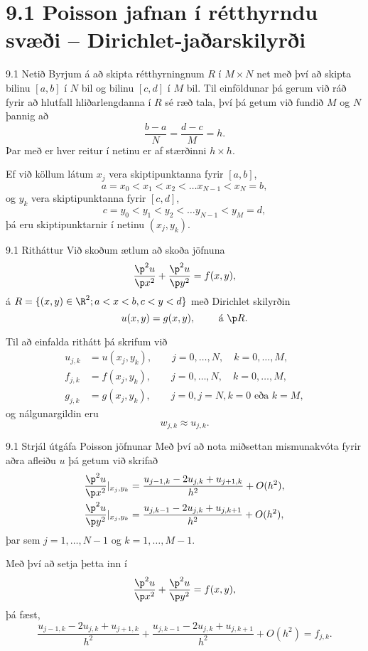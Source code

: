 \section*{9.1 Poisson jafnan í rétthyrndu svæði --  Dirichlet-jaðarskilyrði }

\begin{frame}{9.1 Netið}
 Byrjum á að skipta rétthyrningnum $R$ í $M \times N$ net með því að skipta
 bilinu $[a,b]$ í $N$ bil og bilinu $[c,d]$ í $M$ bil. \pause
 Til einföldunar þá gerum við ráð fyrir að hlutfall hliðarlengdanna
 í $R$ sé ræð tala, því þá getum við fundið $M$ og $N$ þannig að
 $$
  \frac{b-a}N = \frac{d-c}M = h.
 $$ \pause
 Þar með er hver reitur í netinu er af stærðinni $h \times h$.
 \pause
 \medskip
 
 Ef við köllum látum $x_j$ vera skiptipunktanna fyrir $[a,b]$,
 $$
 a=x_0 < x_1 < x_2 < \ldots x_{N-1} < x_N =b,
 $$
 og $y_k$ vera skiptipunktanna fyrir $[c,d]$,
 $$
 c=y_0 < y_1 < y_2 < \ldots y_{N-1} < y_M = d,
 $$
 þá eru skiptipunktarnir í netinu $(x_j,y_k)$.
\end{frame}


\begin{frame}{9.1 Ritháttur}
Við skoðum ætlum að skoða jöfnuna
 $$ 
    \frac{\p^2 u}{\p x^2} + \frac{\p^2 u}{\p y^2} = f(x,y),
  $$
  á $R = \{ (x,y) \in \R^2 ; a < x < b, c < y < d \}$ með Dirichlet skilyrðin
  $$
    u(x,y) = g(x,y), \qquad \text{ á } \p R.
  $$
  
  \medskip\pause
Til að einfalda rithátt þá skrifum við
\begin{align*}
 u_{j,k} &= u(x_j,y_k), \qquad j=0,\ldots,N, \quad k=0,\ldots,M,\\
 f_{j,k} &= f(x_j,y_k), \qquad j=0,\ldots,N, \quad k=0,\ldots,M,\\
 g_{j,k} &= g(x_j,y_k), \qquad j=0, j=N, k=0 \text{ eða } k=M,
\end{align*} \pause
og nálgunargildin eru 
$$
  w_{j,k} \approx u_{j,k}.
$$
\end{frame}

\begin{frame}{9.1 Strjál útgáfa Poisson jöfnunar}
 Með því að nota miðsettan mismunakvóta fyrir aðra afleiðu $u$ þá getum við 
 skrifað
 \begin{align*}
  \frac{\p^2 u}{\p x^2}|_{x_j,y_k} &= \frac{u_{j-1,k} - 2u_{j,k} + u_{j+1,k}}{h^2}
  + O(h^2), \\
  \frac{\p^2 u}{\p y^2}|_{x_j,y_k} &= \frac{u_{j,k-1} - 2u_{j,k} + u_{j,k+1}}{h^2}
  + O(h^2), 
 \end{align*}
 þar sem $j = 1,\ldots,N-1$ og $k=1,\ldots,M-1$.

\medskip\pause
Með því að setja þetta inn í 
  $$ 
    \frac{\p^2 u}{\p x^2} + \frac{\p^2 u}{\p y^2} = f(x,y),
  $$
  þá fæst, \pause 
  $$
  \frac{u_{j-1,k} - 2u_{j,k} + u_{j+1,k}}{h^2} +
  \frac{u_{j,k-1} - 2u_{j,k} + u_{j,k+1}}{h^2}
  + O(h^2) = f_{j,k}.
  $$
\end{frame}
  
